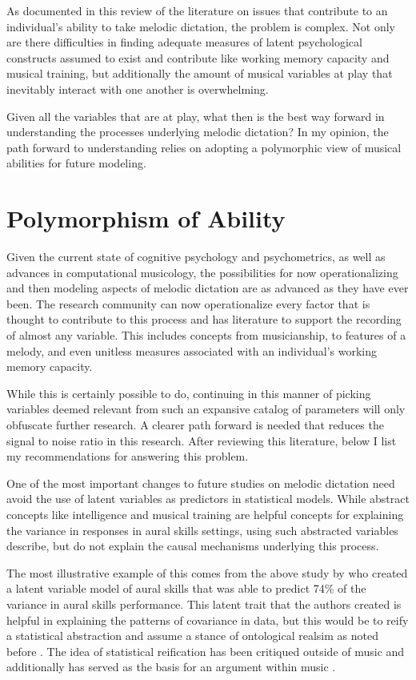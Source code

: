 \documentclass[12pt,]{book}
\begin{document}
As documented in this review of the literature on issues that contribute to an individual's ability to take melodic dictation, the problem is complex.
Not only are there difficulties in finding adequate measures of latent psychological constructs assumed to exist and contribute like working memory capacity and musical training, but additionally the amount of musical variables at play that inevitably interact with one another is overwhelming.

Given all the variables that are at play, what then is the best way forward in understanding the processes underlying melodic dictation?
In my opinion, the path forward to understanding relies on adopting a polymorphic view of musical abilities for future modeling.

\hypertarget{polymorphism-of-ability}{%
\section{Polymorphism of Ability}\label{polymorphism-of-ability}}

Given the current state of cognitive psychology and psychometrics, as well as advances in computational musicology, the possibilities for now operationalizing and then modeling aspects of melodic dictation are as advanced as they have ever been.
The research community can now operationalize every factor that is thought to contribute to this process and has literature to support the recording of almost any variable.
This includes concepts from musicianship, to features of a melody, and even unitless measures associated with an individual's working memory capacity.

While this is certainly possible to do, continuing in this manner of picking variables deemed relevant from such an expansive catalog of parameters will only obfuscate further research.
A clearer path forward is needed that reduces the signal to noise ratio in this research.
After reviewing this literature, below I list my recommendations for answering this problem.

One of the most important changes to future studies on melodic dictation need avoid the use of latent variables as predictors in statistical models.
While abstract concepts like intelligence and musical training are helpful concepts for explaining the variance in responses in aural skills settings, using such abstracted variables describe, but do not explain the causal mechanisms underlying this process.

The most illustrative example of this comes from the above study by \citet{harrisonEffectsMusicalAptitude1994} who created a latent variable model of aural skills that was able to predict 74\% of the variance in aural skills performance.
This latent trait that the authors created is helpful in explaining the patterns of covariance in data, but this would be to reify a statistical abstraction and assume a stance of ontological realsim as noted before \citep{borsboomTheoreticalStatusLatent2003}.
The idea of statistical reification has been critiqued outside of music \citep{gouldMismeasureMan1996, kovacsProcessOverlapTheory2016} and additionally has served as the basis for an argument within music \citep{bakerExaminingMusicalSophistication2018a} .
\end{document}
